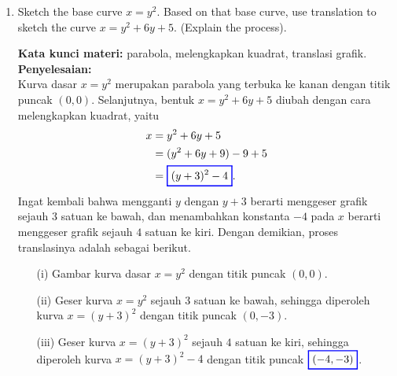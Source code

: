 \documentclass[10pt,openany,a4paper]{article}
\theoremstyle{definition}
\theoremstyle{definition}
\theoremstyle{plain}
\newenvironment{jawab}[2][tes]{%
\par\noindent\textbf{Kata kunci materi:} #1.\\
\textbf{Penyelesaian:} #2%
}{}
\begin{document}
\begin{enumerate}
\begin{jawab}[fungsi kontinu, limit, polinomial]
{\begin{enumerate}
\begin{align*}
        \end{align*}
        Berdasarkan hasil dari (a), diperoleh bahwa \(f(x)\) kontinu di \(x=1\) jika \(k=\frac{1}{2}\), yaitu $f(1)=\frac{3}{2}$, yang sama dengan nilai polinomial di atas saat $x=1$. Dengan demikian, fungsi \(f(x)\) dapat dinyatakan sebagai polinomial
        \begin{align*}
            \colorlet{oldcolor}{.}
        \color{red}
        \setlength{\fboxrule}{1pt} \boxed{\color{oldcolor}f(x) = \frac{1}{2}x^2 + \frac{1}{2}x + \frac{1}{2}}\color{oldcolor}.
        \end{align*}
        \end{enumerate}
    }
    \end{jawab}

    \item Sketch the base curve $x=y^2$. Based on that base curve, use translation to sketch the curve $x=y^2+6y+5$. (Explain the process).
    \begin{jawab}[parabola, melengkapkan kuadrat, translasi grafik]{~\\
        Kurva dasar $x=y^2$ merupakan parabola yang terbuka ke kanan dengan titik puncak $(0,0)$. Selanjutnya, bentuk $x = y^2 + 6y + 5$ diubah dengan cara melengkapkan kuadrat, yaitu
        \begin{align*}
            x &= y^2 + 6y + 5\\
            &= (y^2 + 6y + 9) - 9 + 5\\
            &= \colorlet{oldcolor}{.}
        \color{blue}
        \setlength{\fboxrule}{1pt} \boxed{\color{oldcolor}(y+3)^2 - 4}\color{oldcolor}.
        \end{align*}
        Ingat kembali bahwa mengganti $y$ dengan $y+3$ berarti menggeser grafik sejauh $3$ satuan ke bawah, dan menambahkan konstanta $-4$ pada $x$ berarti menggeser grafik sejauh $4$ satuan ke kiri. Dengan demikian, proses translasinya adalah sebagai berikut.
        \begin{enumerate}
            \item[(i)] Gambar kurva dasar $x=y^2$ dengan titik puncak $(0,0)$.
            \item[(ii)] Geser kurva $x=y^2$ sejauh $3$ satuan ke bawah, sehingga diperoleh kurva $x=(y+3)^2$ dengan titik puncak $(0,-3)$.
            \item[(iii)] Geser kurva $x=(y+3)^2$ sejauh $4$ satuan ke kiri, sehingga diperoleh kurva $x=(y+3)^2-4$ dengan titik puncak $\colorlet{oldcolor}{.}
        \color{blue}
        \setlength{\fboxrule}{1pt} \boxed{\color{oldcolor}(-4,-3)}\color{oldcolor}$.

\end{enumerate}}
\end{jawab}
\end{enumerate}
\end{document}
